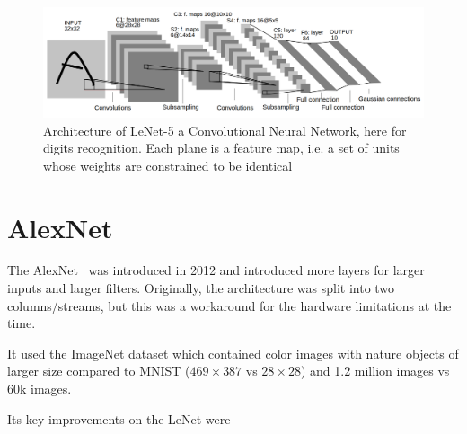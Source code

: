 \documentclass[11pt]{article}
\begin{document}
\begin{figure}[H]
    \centering
    \includegraphics[width=\linewidth]{figures/LeNetFigure.png}
    \caption{Architecture of LeNet-5 a Convolutional Neural Network, here for digits recognition. Each plane is a feature map, i.e. a set of units
    whose weights are constrained to be identical~\cite{LeNet}}
\end{figure}




\section{AlexNet}

The AlexNet~\cite{AlexNet} was introduced in 2012 and introduced more layers for larger inputs and larger filters. Originally, the architecture was split into two columns/streams, but this was a workaround for the hardware limitations at the time. 

It used the ImageNet dataset which contained color images with nature objects of larger size compared to MNIST ($469\times 387$ vs $28 \times 28$) and 1.2 million images vs 60k images.

Its key improvements on the LeNet were
\end{document}
